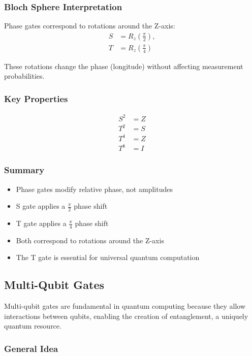 \subsubsection{Bloch Sphere Interpretation}

Phase gates correspond to rotations around the Z-axis:
\begin{align}
S &= R_z\left(\frac{\pi}{2}\right), \\
T &= R_z\left(\frac{\pi}{4}\right)
\end{align}

These rotations change the phase (longitude) without affecting measurement probabilities.

\subsubsection{Key Properties}

\begin{align}
S^2 &= Z \\
T^2 &= S \\
T^4 &= Z \\
T^8 &= I
\end{align}

\subsubsection{Summary}

\begin{itemize}
\item Phase gates modify relative phase, not amplitudes
\item S gate applies a $\frac{\pi}{2}$ phase shift
\item T gate applies a $\frac{\pi}{4}$ phase shift
\item Both correspond to rotations around the Z-axis
\item The T gate is essential for universal quantum computation
\end{itemize}

\subsection{Multi-Qubit Gates}

Multi-qubit gates are fundamental in quantum computing because they allow interactions 
between qubits, enabling the creation of entanglement, a uniquely quantum resource.

\subsubsection{General Idea}

